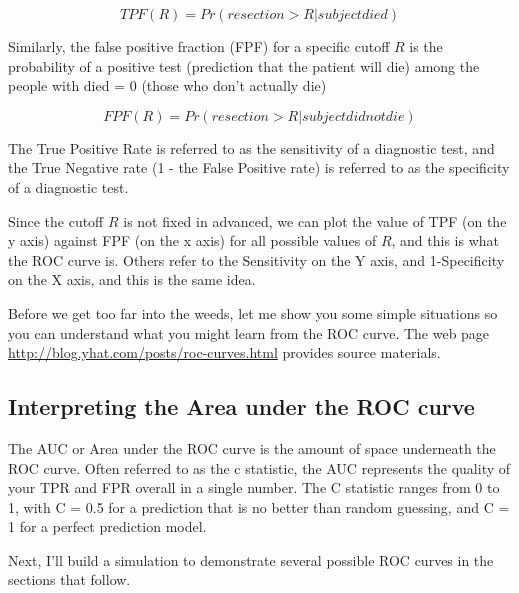 \documentclass[]{book}
\theoremstyle{definition}
\theoremstyle{definition}
\theoremstyle{definition}
\theoremstyle{remark}
\begin{document}
\[
TPF(R) = Pr(resection > R | subject died)
\]

Similarly, the false positive fraction (FPF) for a specific cutoff \(R\)
is the probability of a positive test (prediction that the patient will
die) among the people with died = 0 (those who don't actually die)

\[
FPF(R) = Pr(resection > R | subject did not die)
\]

The True Positive Rate is referred to as the sensitivity of a diagnostic
test, and the True Negative rate (1 - the False Positive rate) is
referred to as the specificity of a diagnostic test.

Since the cutoff \(R\) is not fixed in advanced, we can plot the value
of TPF (on the y axis) against FPF (on the x axis) for all possible
values of \(R\), and this is what the ROC curve is. Others refer to the
Sensitivity on the Y axis, and 1-Specificity on the X axis, and this is
the same idea.

Before we get too far into the weeds, let me show you some simple
situations so you can understand what you might learn from the ROC
curve. The web page \url{http://blog.yhat.com/posts/roc-curves.html}
provides source materials.

\subsection{Interpreting the Area under the ROC
curve}\label{interpreting-the-area-under-the-roc-curve}

The AUC or Area under the ROC curve is the amount of space underneath
the ROC curve. Often referred to as the c statistic, the AUC represents
the quality of your TPR and FPR overall in a single number. The C
statistic ranges from 0 to 1, with C = 0.5 for a prediction that is no
better than random guessing, and C = 1 for a perfect prediction model.

Next, I'll build a simulation to demonstrate several possible ROC curves
in the sections that follow.
\end{document}
